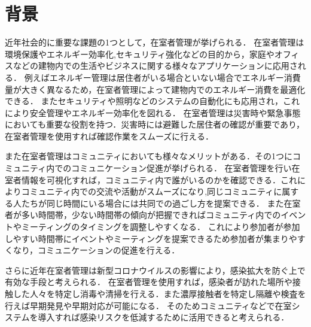 





\section{背景}\label{1.1}
近年社会的に重要な課題の1つとして，在室者管理が挙げられる．
在室者管理は環境保護やエネルギー効率化,セキュリティ強化などの目的から，家庭やオフィスなどの建物内での生活やビジネスに関する様々なアプリケーションに応用される．
例えばエネルギー管理は居住者がいる場合といない場合でエネルギー消費量が大きく異なるため，在室者管理によって建物内でのエネルギー消費を最適化できる．
またセキュリティや照明などのシステムの自動化にも応用され，これにより安全管理やエネルギー効率化を図れる．
在室者管理は災害時や緊急事態においても重要な役割を持つ．災害時には避難した居住者の確認が重要であり，在室者管理を使用すれば確認作業をスムーズに行える．

また在室者管理はコミュニティにおいても様々なメリットがある．その1つにコミュニティ内でのコミュニケーション促進が挙げられる．
在室者管理を行い在室者情報を可視化すれば，コミュニティ内で誰がいるのかを確認できる．これによりコミュニティ内での交流や活動がスムーズになり,同じコミュニティに属する人たちが同じ時間にいる場合には共同での過ごし方を提案できる．
また在室者が多い時間帯，少ない時間帯の傾向が把握できればコミュニティ内でのイベントやミーティングのタイミングを調整しやすくなる．
これにより参加者が参加しやすい時間帯にイベントやミーティングを提案できるため参加者が集まりやすくなり，コミュニケーションの促進を行える．

さらに近年在室者管理は新型コロナウイルスの影響により，感染拡大を防ぐ上で有効な手段と考えられる．
在室者管理を使用すれば，感染者が訪れた場所や接触した人々を特定し消毒や清掃を行える．また濃厚接触者を特定し隔離や検査を行えば早期発見や早期対応が可能になる．
そのためコミュニティなどで在室システムを導入すれば感染リスクを低減するために活用できると考えられる．

